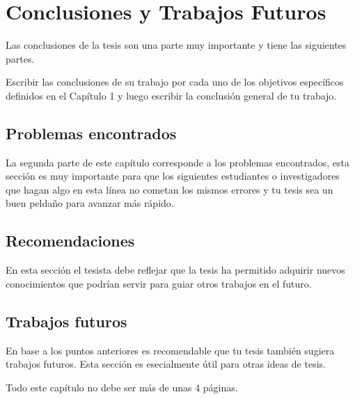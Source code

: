 \chapter{Conclusiones y Trabajos Futuros}\label{chap:conclusiones}

Las conclusiones de la tesis son una parte muy importante y tiene las siguientes partes.

Escribir las conclusiones de su trabajo por cada uno de los objetivos específicos definidos en el Capítulo 1 y luego escribir la conclusión general de tu trabajo.

\section{Problemas encontrados}
La segunda  parte de este capítulo corresponde a los problemas encontrados, esta sección es muy importante para que los siguientes estudiantes o investigadores que hagan algo en esta línea no cometan los mismos errores y tu tesis sea un buen peldaño para avanzar más rápido.

\section{Recomendaciones}
En esta sección el tesista debe reflejar que la tesis ha permitido adquirir nuevos conocimientos que podrían servir para guiar otros trabajos en el futuro.

\section{Trabajos futuros}
En base a los puntos anteriores es recomendable que tu tesis también sugiera trabajos futuros. Esta sección es esecialmente útil para otras ideas de tesis.

Todo este capítulo no debe ser más de unas 4 páginas.
